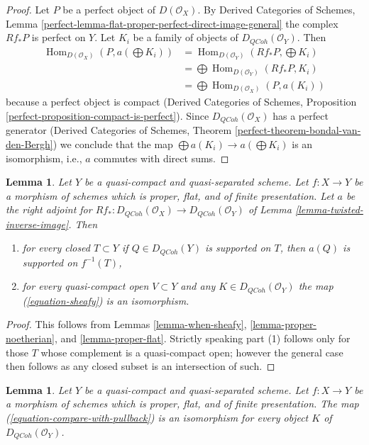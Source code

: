 \documentclass{stacks-project}
\theoremstyle{plain}
\newtheorem{lemma}[subsection]{Lemma}
\theoremstyle{definition}
\theoremstyle{remark}
\numberwithin{equation}{subsection}
\def\Hom{\mathop{\mathrm{Hom}}\nolimits}
\def\QCoh{\mathit{QCoh}}
\begin{document}
\begin{proof}
Let $P$ be a perfect object of $D(\mathcal{O}_X)$. By
Derived Categories of Schemes, Lemma
\ref{perfect-lemma-flat-proper-perfect-direct-image-general}
the complex $Rf_*P$ is perfect on $Y$.
Let $K_i$ be a family of objects of $D_\QCoh(\mathcal{O}_Y)$.
Then
\begin{align*}
\Hom_{D(\mathcal{O}_X)}(P, a(\bigoplus K_i))
& =
\Hom_{D(\mathcal{O}_Y)}(Rf_*P, \bigoplus K_i) \\
& =
\bigoplus \Hom_{D(\mathcal{O}_Y)}(Rf_*P, K_i) \\
& =
\bigoplus \Hom_{D(\mathcal{O}_X)}(P, a(K_i))
\end{align*}
because a perfect object is compact (Derived Categories of Schemes,
Proposition \ref{perfect-proposition-compact-is-perfect}).
Since $D_\QCoh(\mathcal{O}_X)$ has a perfect generator
(Derived Categories of Schemes, Theorem
\ref{perfect-theorem-bondal-van-den-Bergh})
we conclude that the map $\bigoplus a(K_i) \to a(\bigoplus K_i)$
is an isomorphism, i.e., $a$ commutes with direct sums.
\end{proof}

\begin{lemma}
\label{lemma-proper-flat-relative}
Let $Y$ be a quasi-compact and quasi-separated scheme.
Let $f : X \to Y$ be a morphism of schemes which is proper, flat, and
of finite presentation.
Let $a$ be the right adjoint for
$Rf_* : D_\QCoh(\mathcal{O}_X) \to D_\QCoh(\mathcal{O}_Y)$ of
Lemma \ref{lemma-twisted-inverse-image}. Then
\begin{enumerate}
\item for every closed $T \subset Y$ if $Q \in D_\QCoh(Y)$ is supported on $T$,
then $a(Q)$ is supported on $f^{-1}(T)$,
\item for every quasi-compact open $V \subset Y$ and any
$K \in D_\QCoh(\mathcal{O}_Y)$ the map (\ref{equation-sheafy})
is an isomorphism.
\end{enumerate}
\end{lemma}

\begin{proof}
This follows from Lemmas \ref{lemma-when-sheafy},
\ref{lemma-proper-noetherian}, and
\ref{lemma-proper-flat}. Strictly speaking part (1) follows
only for those $T$ whose complement is a quasi-compact open;
however the general case then follows as any closed subset is an
intersection of such.
\end{proof}

\begin{lemma}
\label{lemma-compare-with-pullback-flat-proper}
Let $Y$ be a quasi-compact and quasi-separated scheme.
Let $f : X \to Y$ be a morphism of schemes which is proper, flat, and
of finite presentation.
The map (\ref{equation-compare-with-pullback}) is an isomorphism
for every object $K$ of $D_\QCoh(\mathcal{O}_Y)$.
\end{lemma}
\end{document}
